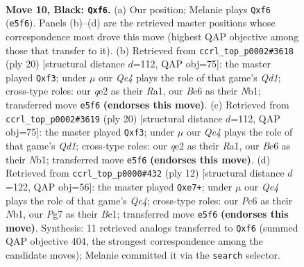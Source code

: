 \documentclass[11pt]{article}
\begin{document}
\begin{figure}[p]\centering
\begin{subfigure}{0.46\textwidth}\centering
\resizebox{\linewidth}{!}{%
\newchessgame
\chessboard[
  setfen={r3k1nr/ppp2ppp/2p1bN2/2b1q3/8/8/PPP1QPPP/R1B1KB1R b KQkq - 1 10},
  showmover=false,
  pgfstyle=straightmove, color=movearrow, markmove={e5-f6}
]}
\caption{}
\end{subfigure}\hfill
\begin{subfigure}{0.46\textwidth}\centering
\resizebox{\linewidth}{!}{%
\newchessgame
\chessboard[
  setfen={r2qkb1r/1ppb1p2/p2p1npp/8/4P3/1B2Bn2/PPP2PPP/RN1QR1K1 w kq - 0 11},
  showmover=false,
  pgfstyle=straightmove, color=movearrow, markmove={d1-f3}
]}
\caption{}
\end{subfigure}
\\[4pt]
\begin{subfigure}{0.46\textwidth}\centering
\resizebox{\linewidth}{!}{%
\newchessgame
\chessboard[
  setfen={r2qkb1r/1ppb1p2/p2p1npp/8/4P3/1B2Bn2/PPP2PPP/RN1QR1K1 w kq - 0 11},
  showmover=false,
  pgfstyle=straightmove, color=movearrow, markmove={d1-f3}
]}
\caption{}
\end{subfigure}\hfill
\begin{subfigure}{0.46\textwidth}\centering
\resizebox{\linewidth}{!}{%
\newchessgame
\chessboard[
  setfen={rnb1kbnr/ppp1q1pp/3p4/8/2BPQp2/8/PPP3PP/RNB1K1NR w KQkq - 1 7},
  showmover=false,
  pgfstyle=straightmove, color=movearrow, markmove={e4-e7}
]}
\caption{}
\end{subfigure}
\caption{\textbf{Move 10, Black: \texttt{Qxf6}.} (a) Our position; Melanie plays \texttt{Qxf6} (\texttt{e5f6}). Panels (b)--(d) are the retrieved master positions whose correspondence most drove this move (highest QAP objective among those that transfer to it). (b) Retrieved from \texttt{ccrl\_top\_p0002\#3618} (ply 20) [structural distance $d$=112, QAP obj=75]: the master played \texttt{Qxf3}; under $\mu$ our \emph{Qe4} plays the role of that game's \emph{Qd1}; cross-type roles: our \emph{q}e2 as their \emph{R}a1, our \emph{B}e6 as their \emph{N}b1; transferred move \texttt{e5f6} \textbf{(endorses this move)}. (c) Retrieved from \texttt{ccrl\_top\_p0002\#3619} (ply 20) [structural distance $d$=112, QAP obj=75]: the master played \texttt{Qxf3}; under $\mu$ our \emph{Qe4} plays the role of that game's \emph{Qd1}; cross-type roles: our \emph{q}e2 as their \emph{R}a1, our \emph{B}e6 as their \emph{N}b1; transferred move \texttt{e5f6} \textbf{(endorses this move)}. (d) Retrieved from \texttt{ccrl\_top\_p0000\#432} (ply 12) [structural distance $d$=122, QAP obj=56]: the master played \texttt{Qxe7+}; under $\mu$ our \emph{Qe4} plays the role of that game's \emph{Qe4}; cross-type roles: our \emph{P}c6 as their \emph{N}b1, our \emph{P}g7 as their \emph{B}c1; transferred move \texttt{e5f6} \textbf{(endorses this move)}. Synthesis: 11 retrieved analogs transferred to \texttt{Qxf6} (summed QAP objective 404, the strongest correspondence among the candidate moves); Melanie committed it via the \texttt{search} selector.}
\label{fig:thought-m19}
\end{figure}
\end{document}
